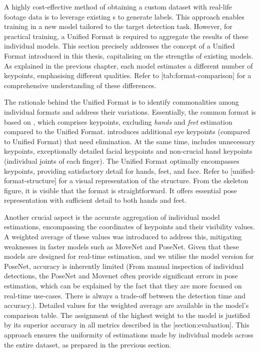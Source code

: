 A highly cost-effective method of obtaining a custom dataset with real-life footage data is to leverage existing \NN\-s to generate labels. This approach enables training in a new model tailored to the target detection task. However, for practical training, a Unified Format is required to aggregate the results of these individual models. This section precisely addresses the concept of a Unified Format introduced in this thesis, capitalising on the strengths of existing models. As explained in the previous chapter, each model estimates a different number of keypoints, emphasising different qualities. Refer to [tab:format-comparison] for a comprehensive understanding of these differences.

The rationale behind the Unified Format is to identify commonalities among individual formats and address their variations. Essentially, the common format is based on , which comprises  keypoints, excluding {\em hands} and {\em feet} estimation compared to the Unified Format.  introduces additional eye keypoints (compared to Unified Format) that need elimination. At the same time,  includes  unnecessary keypoints, exceptionally detailed fa\-cial keypoints and non-crucial hand keypoints (individual joints of each finger). The Unified Format optimally encompasses  keypoints, providing satisfactory detail for hands, feet, and face. Refer to [unified-format-structure] for a visual representation of the structure. From the skeleton figure, it is visible that the format is straightforward. It offers essential pose representation with sufficient detail to both hands and feet.

Another crucial aspect is the accurate aggregation of individual model estimations, encompassing the coordinates of keypoints and their visibility values. A weighted average of these values was introduced to address this, mitigating weaknesses in faster models such as MoveNet and PoseNet. Given that these models are designed for real-time estimation, and we utilise the  model version for PoseNet, accuracy is inherently limited (From manual inspection of individual detections, the PoseNet and Movenet often provide significant errors in pose estimation, which can be explained by the fact that they are more focused on real-time use-cases. There is always a trade-off between the detection time and accuracy.). Detailed values for the weighted average are available in the model's comparison table. The assignment of the highest weight to the  model is justified by its superior accuracy in all metrics described in the [section:evaluation]. This approach ensures the uniformity of estimations made by individual models across the entire dataset, as prepared in the previous section.


